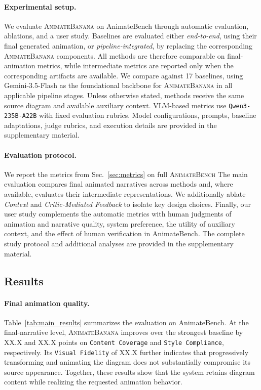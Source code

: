 \documentclass{article} %
\begin{document}
\paragraph{Experimental setup.}
We evaluate \textsc{AnimateBanana} on AnimateBench through automatic
evaluation, ablations, and a user study. Baselines are evaluated either
\emph{end-to-end}, using their final generated animation, or
\emph{pipeline-integrated}, by replacing the corresponding
\textsc{AnimateBanana} components. All methods are therefore comparable on
final-animation metrics, while intermediate metrics are reported only when
the corresponding artifacts are available. We compare against 17 baselines, using Gemini-3.5-Flash as the foundational backbone for \textsc{AnimateBanana} in all applicable pipeline stages.  Unless otherwise stated, methods
receive the same source diagram and available auxiliary context. VLM-based
metrics use \texttt{Qwen3-235B-A22B} with fixed evaluation rubrics. Model configurations,
prompts, baseline adaptations, judge rubrics, and execution details are
provided in the supplementary material.

\paragraph{Evaluation protocol.}
We report the metrics from Sec.~\ref{sec:metrics} on full \textsc{AnimateBench} The main evaluation compares final animated
narratives across methods and, where available, evaluates their intermediate
representations. We additionally ablate \textit{Context} and \textit{Critic-Mediated Feedback} to isolate key design choices. Finally, our user study
complements the automatic metrics with human judgments of animation and
narrative quality, system preference, the utility of auxiliary context, and
the effect of human verification in AnimateBench. The complete study protocol
and additional analyses are provided in the supplementary material.



\subsection{Results}
\label{sec:results}

\paragraph{Final animation quality.}
Table~\ref{tab:main_results} summarizes the evaluation on AnimateBench.
At the final-narrative level, \textsc{AnimateBanana} improves over the strongest baseline by XX.X and
XX.X points on \texttt{Content Coverage} and \texttt{Style Compliance},
respectively. Its \texttt{Visual Fidelity} of XX.X further indicates that
progressively transforming and animating the diagram does not substantially
compromise its source appearance. Together, these results show that the system
retains diagram content while realizing the requested animation behavior.
\end{document}

